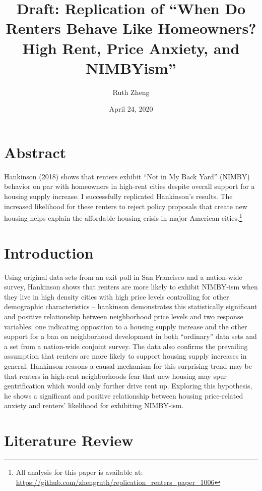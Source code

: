 \documentclass[]{article}
\title{Draft: Replication of ``When Do Renters Behave Like Homeowners? High Rent, Price Anxiety, and NIMBYism''}
\author{Ruth Zheng}
\date{April 24, 2020}
\begin{document}
\maketitle

\hypertarget{abstract}{%
\section{Abstract}\label{abstract}}

Hankinson (2018) shows that renters exhibit ``Not in My Back Yard'' (NIMBY) behavior on par with homeowners in high-rent cities despite overall support for a housing supply increase. I successfully replicated Hankinson's results. The increased likelihood for these renters to reject policy proposals that create new housing helps explain the affordable housing crisis in major American cities.\footnote{All analysis for this paper is available at: \url{https://github.com/zhengruth/replication_renters_paper_1006}}

\hypertarget{introduction}{%
\section{Introduction}\label{introduction}}

Using original data sets from an exit poll in San Francisco and a nation-wide survey, Hankinson shows that renters are more likely to exhibit NIMBY-ism when they live in high density cities with high price levels controlling for other demographic characteristics -- hankinson demonstrates this statistically significant and positive relationship between neighborhood price levels and two response variables: one indicating opposition to a housing supply increase and the other support for a ban on neighborhood development in both ``ordinary'' data sets and a set from a nation-wide conjoint survey. The data also confirms the prevailing assumption that renters are more likely to support housing supply increases in general. Hankinson reasons a causal mechanism for this surprising trend may be that renters in high-rent neighborhoods fear that new housing may spur gentrification which would only further drive rent up. Exploring this hypothesis, he shows a significant and positive relationship between housing price-related anxiety and renters' likelihood for exhibiting NIMBY-ism.

\hypertarget{literature-review}{%
\section{Literature Review}\label{literature-review}}
\end{document}
